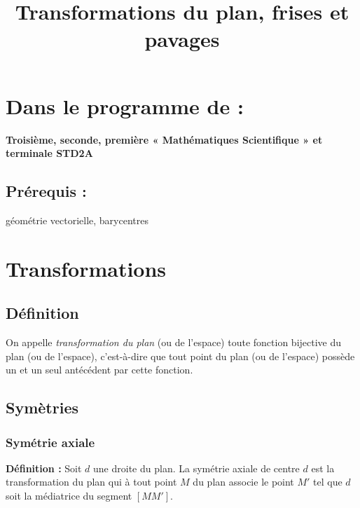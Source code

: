 \documentclass[a4paper,12pt]{article}
\title{Transformations du plan, frises et pavages}
\begin{document}
    \maketitle

    \section*{Dans le programme de :}
    \textbf{Troisième, seconde, première « Mathématiques Scientifique » et terminale STD2A}

    \subsection*{Prérequis :}
    géométrie vectorielle, barycentres

    \section{Transformations}
    \subsection{Définition}
    On appelle \textit{transformation du plan} (ou de l’espace) toute fonction bijective du
    plan (ou de l’espace), c’est-à-dire que tout point du plan (ou de l’espace) possède un et un seul
    antécédent par cette fonction. \\

    \subsection{Symètries}
    \subsubsection{Symétrie axiale}
    \textbf{Définition :} Soit $d$ une droite du plan. La symétrie axiale de centre $d$ est la transformation du plan qui à tout point $M$ du plan associe le point $M'$ tel que $d$ soit la médiatrice du segment $[MM']$. \\
    \begin{center}
    \end{center}
\end{document}
